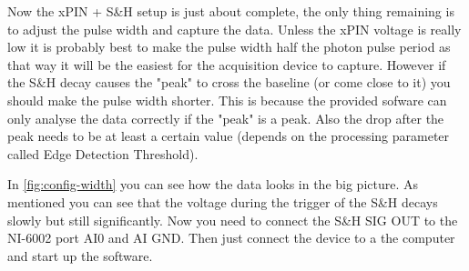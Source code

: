 \documentclass[a4paper, 10pt]{article}
\begin{document}
Now the xPIN + S\&H setup is just about complete, the only thing remaining is to adjust the pulse width and capture the data.
Unless the xPIN voltage is really low it is probably best to make the pulse width half the photon pulse period as that way it will be the easiest for the acquisition device to capture.
However if the S\&H decay causes the "peak" to cross the baseline (or come close to it) you should make the pulse width shorter.
This is because the provided sofware can only analyse the data correctly if the "peak" is a peak.
Also the drop after the peak needs to be at least a certain value (depends on the processing parameter called Edge Detection Threshold).

In \cref{fig:config-width} you can see how the data looks in the big picture.
As mentioned you can see that the voltage during the trigger of the S\&H decays slowly but still significantly.
Now you need to connect the S\&H SIG OUT to the NI-6002 port AI0 and AI GND.
Then just connect the device to a the computer and start up the software.
\end{document}
